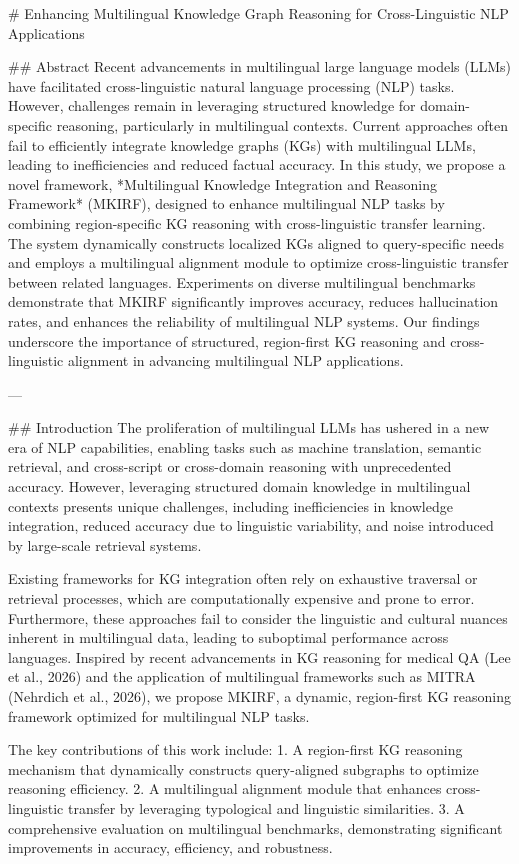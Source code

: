 # Enhancing Multilingual Knowledge Graph Reasoning for Cross-Linguistic NLP Applications

## Abstract
Recent advancements in multilingual large language models (LLMs) have facilitated cross-linguistic natural language processing (NLP) tasks. However, challenges remain in leveraging structured knowledge for domain-specific reasoning, particularly in multilingual contexts. Current approaches often fail to efficiently integrate knowledge graphs (KGs) with multilingual LLMs, leading to inefficiencies and reduced factual accuracy. In this study, we propose a novel framework, *Multilingual Knowledge Integration and Reasoning Framework* (MKIRF), designed to enhance multilingual NLP tasks by combining region-specific KG reasoning with cross-linguistic transfer learning. The system dynamically constructs localized KGs aligned to query-specific needs and employs a multilingual alignment module to optimize cross-linguistic transfer between related languages. Experiments on diverse multilingual benchmarks demonstrate that MKIRF significantly improves accuracy, reduces hallucination rates, and enhances the reliability of multilingual NLP systems. Our findings underscore the importance of structured, region-first KG reasoning and cross-linguistic alignment in advancing multilingual NLP applications.

---

## Introduction
The proliferation of multilingual LLMs has ushered in a new era of NLP capabilities, enabling tasks such as machine translation, semantic retrieval, and cross-script or cross-domain reasoning with unprecedented accuracy. However, leveraging structured domain knowledge in multilingual contexts presents unique challenges, including inefficiencies in knowledge integration, reduced accuracy due to linguistic variability, and noise introduced by large-scale retrieval systems.

Existing frameworks for KG integration often rely on exhaustive traversal or retrieval processes, which are computationally expensive and prone to error. Furthermore, these approaches fail to consider the linguistic and cultural nuances inherent in multilingual data, leading to suboptimal performance across languages. Inspired by recent advancements in KG reasoning for medical QA (Lee et al., 2026) and the application of multilingual frameworks such as MITRA (Nehrdich et al., 2026), we propose MKIRF, a dynamic, region-first KG reasoning framework optimized for multilingual NLP tasks.

The key contributions of this work include:
1. A region-first KG reasoning mechanism that dynamically constructs query-aligned subgraphs to optimize reasoning efficiency.
2. A multilingual alignment module that enhances cross-linguistic transfer by leveraging typological and linguistic similarities.
3. A comprehensive evaluation on multilingual benchmarks, demonstrating significant improvements in accuracy, efficiency, and robustness.

